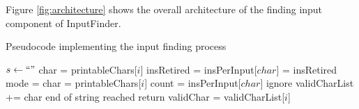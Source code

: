 \documentclass{acm_proc_article-sp}
\def \tool {InputFinder}
\begin{document}
Figure \ref{fig:architecture} shows the overall architecture of the finding input component of \tool{}.

\begin{algorithm}
\caption{Pseudocode implementing the input finding process}
\label{findinputcode}
\begin{algorithmic}[1]
\State $s \leftarrow ``"$ 
\State char = printableChars[$i$]
\State insRetired =  \label{execute}%
\State insPerInput[$char$] = insRetired %
\EndFor
\State mode =  \label{mode}%
 \label{filterbegin}%
\State char = printableChars[$i$]
\State count = insPerInput[$char$]
\State ignore
\Else
\State validCharList += char
\EndIf
\EndFor \label{filterend}
\State end of string reached
\State return
\Else
{} \label{fork}
\State validChar = validCharList[$i$]
\State {}
\EndFor
\EndIf
\EndProcedure
\end{algorithmic}
\end{algorithm}
\end{document}
